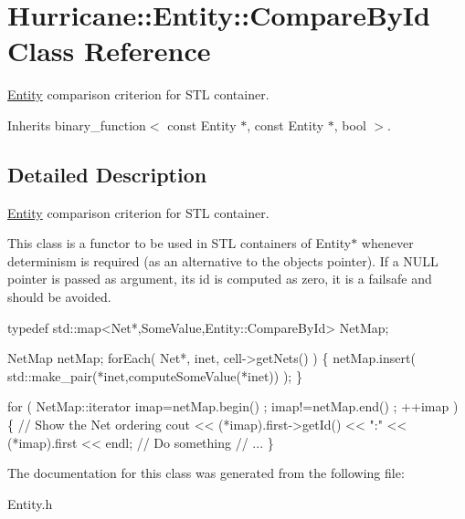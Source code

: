 \hypertarget{structHurricane_1_1Entity_1_1CompareById}{}\section{Hurricane\+:\+:Entity\+:\+:Compare\+By\+Id Class Reference}
\label{structHurricane_1_1Entity_1_1CompareById}


\mbox{\hyperlink{classHurricane_1_1Entity}{Entity}} comparison criterion for S\+TL container.  




Inherits binary\+\_\+function$<$ const Entity $\ast$, const Entity $\ast$, bool $>$.



\subsection{Detailed Description}
\mbox{\hyperlink{classHurricane_1_1Entity}{Entity}} comparison criterion for S\+TL container. 

This class is a functor to be used in S\+TL containers of {\ttfamily Entity$\ast$} whenever determinism is required (as an alternative to the object\textquotesingle{}s pointer). If a {\ttfamily N\+U\+LL} pointer is passed as argument, it\textquotesingle{}s {\ttfamily id} is computed as zero, it is a failsafe and should be avoided.


\begin{DoxyCode}
\textcolor{keyword}{typedef}  std::map<Net*,SomeValue,Entity::CompareById>  NetMap;

NetMap  netMap;
forEach( Net*, inet, cell->getNets() ) \{
  netMap.insert( std::make\_pair(*inet,computeSomeValue(*inet)) );
\}

\textcolor{keywordflow}{for} ( NetMap::iterator imap=netMap.begin() ; imap!=netMap.end() ; ++imap ) \{
  \textcolor{comment}{// Show the Net ordering}
  cout << (*imap).first->getId() << \textcolor{stringliteral}{":"} << (*imap).first << endl;
  \textcolor{comment}{// Do something}
  \textcolor{comment}{// ...}
\}
\end{DoxyCode}
 

The documentation for this class was generated from the following file\+:\begin{DoxyCompactItemize}
\item 
Entity.\+h\end{DoxyCompactItemize}
